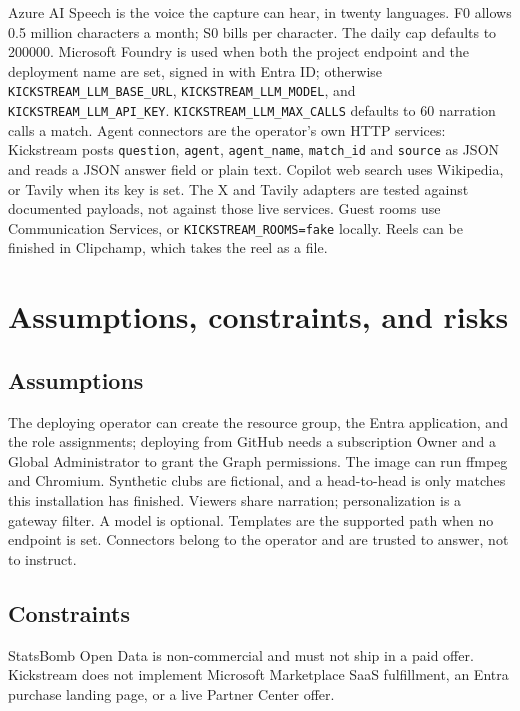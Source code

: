 \documentclass[11pt]{article}
\begin{document}
Azure AI Speech is the voice the capture can hear, in twenty languages.
F0 allows 0.5 million characters a month; S0 bills per character.
The daily cap defaults to 200000.
Microsoft Foundry is used when both the project endpoint and the deployment name
are set, signed in with Entra ID; otherwise \texttt{KICKSTREAM\_LLM\_BASE\_URL},
\texttt{KICKSTREAM\_LLM\_MODEL}, and \texttt{KICKSTREAM\_LLM\_API\_KEY}.
\texttt{KICKSTREAM\_LLM\_MAX\_CALLS} defaults to 60 narration calls a match.
Agent connectors are the operator's own HTTP services: Kickstream posts
\texttt{question}, \texttt{agent}, \texttt{agent\_name}, \texttt{match\_id} and
\texttt{source} as JSON and reads a JSON answer field or plain text.
Copilot web search uses Wikipedia, or Tavily when its key is set.
The X and Tavily adapters are tested against documented payloads, not against
those live services.
Guest rooms use Communication Services, or \texttt{KICKSTREAM\_ROOMS=fake} locally.
Reels can be finished in Clipchamp, which takes the reel as a file.

\section{Assumptions, constraints, and risks}

\subsection{Assumptions}

The deploying operator can create the resource group, the Entra application, and
the role assignments; deploying from GitHub needs a subscription Owner and a
Global Administrator to grant the Graph permissions.
The image can run ffmpeg and Chromium.
Synthetic clubs are fictional, and a head-to-head is only matches this
installation has finished.
Viewers share narration; personalization is a gateway filter.
A model is optional. Templates are the supported path when no endpoint is set.
Connectors belong to the operator and are trusted to answer, not to instruct.

\subsection{Constraints}

StatsBomb Open Data is non-commercial and must not ship in a paid offer.
Kickstream does not implement Microsoft Marketplace SaaS fulfillment, an Entra
purchase landing page, or a live Partner Center offer.
\end{document}
